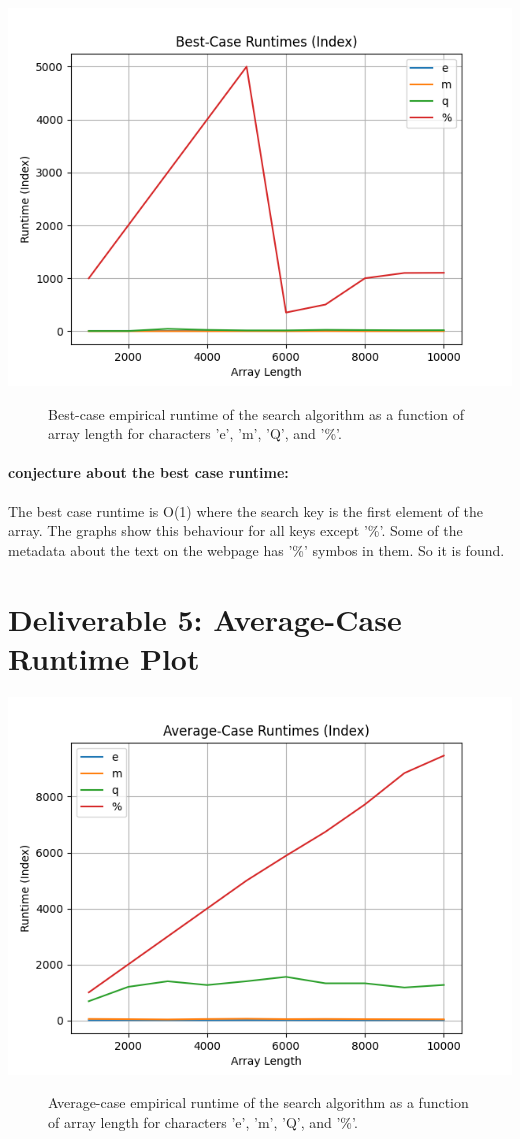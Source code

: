\documentclass{article}
\begin{document}
\includegraphics[width=\textwidth]{best-case_runtimes_(index).png}
\begin{figure}
    \caption{Best-case empirical runtime of the search algorithm as a function of array length for characters 'e', 'm', 'Q', and '\%'.}
\end{figure}

\paragraph*{conjecture about the best case runtime: }
The best case runtime is O(1) where the search key is the first element of the array. The graphs show this behaviour for all keys except '\%'. Some of the metadata about the text on the webpage has '\%' symbos in them. So it is found.
\section*{Deliverable 5: Average-Case Runtime Plot}

\includegraphics[width=\textwidth]{average-case_runtimes_(index).png}
\begin{figure}
    \caption{Average-case empirical runtime of the search algorithm as a function of array length for characters 'e', 'm', 'Q', and '\%'.}
\end{figure}
\end{document}
